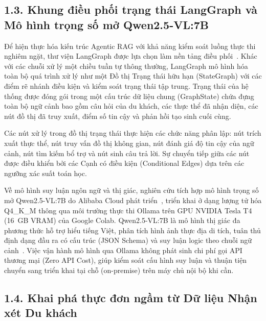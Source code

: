\subsection*{1.3. Khung điều phối trạng thái LangGraph và Mô hình trọng số mở Qwen2.5-VL:7B}
{}

Để hiện thực hóa kiến trúc Agentic RAG với khả năng kiểm soát luồng thực thi nghiêm ngặt, thư viện LangGraph được lựa chọn làm nền tảng điều phối~\cite{langgraph2024}. Khác với các chuỗi xử lý một chiều tuần tự thông thường, LangGraph mô hình hóa toàn bộ quá trình xử lý như một Đồ thị Trạng thái hữu hạn (StateGraph) với các điểm rẽ nhánh điều kiện và kiểm soát trạng thái tập trung. Trạng thái của hệ thống được đóng gói trong một cấu trúc dữ liệu chung (GraphState) chứa đựng toàn bộ ngữ cảnh bao gồm câu hỏi của du khách, các thực thể đã nhận diện, các nút đồ thị đã truy xuất, điểm số tin cậy và phản hồi tạo sinh cuối cùng.

Các nút xử lý trong đồ thị trạng thái thực hiện các chức năng phân lập: nút trích xuất thực thể, nút truy vấn đồ thị không gian, nút đánh giá độ tin cậy của ngữ cảnh, nút tìm kiếm bổ trợ và nút sinh câu trả lời. Sự chuyển tiếp giữa các nút được điều khiển bởi các Cạnh có điều kiện (Conditional Edges) dựa trên các ngưỡng xác suất toán học.

Về mô hình suy luận ngôn ngữ và thị giác, nghiên cứu tích hợp mô hình trọng số mở Qwen2.5-VL:7B do Alibaba Cloud phát triển~\cite{qwen2024team}, triển khai ở dạng lượng tử hóa Q4\_K\_M thông qua môi trường thực thi Ollama trên GPU NVIDIA Tesla T4 (16~GB VRAM) của Google Colab. Qwen2.5-VL:7B là mô hình thị giác đa phương thức hỗ trợ hiểu tiếng Việt, phân tích hình ảnh thực địa di tích, tuân thủ định dạng đầu ra có cấu trúc (JSON Schema) và suy luận logic theo chuỗi ngữ cảnh~\cite{qwen2024team}. Việc vận hành mô hình qua Ollama không phát sinh chi phí gọi API thương mại (Zero API Cost), giúp kiểm soát cấu hình suy luận và thuận tiện chuyển sang triển khai tại chỗ (on-premise) trên máy chủ nội bộ khi cần.

\subsection*{1.4. Khai phá thực đơn ngầm từ Dữ liệu Nhận xét Du khách}
{}


